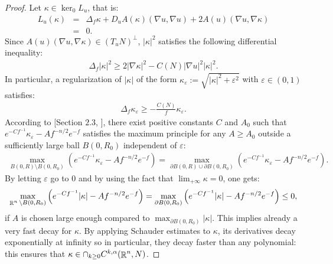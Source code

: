 \documentclass[a4paper,11pt,reqno]{amsart}
\def\R{\mathop{\rm \mathbb{R}}\nolimits}
\begin{document}
\begin{proof}
Let $\kappa\in\ker_0L_u$, that is:
\begin{eqnarray*}
L_u(\kappa)&=&\Delta_f\kappa+D_uA(\kappa)(\nabla u,\nabla u)+2A(u)(\nabla u,\nabla \kappa)\\
&=&0.
\end{eqnarray*}
Since $A(u)(\nabla u,\nabla \kappa)\in (T_uN)^{\perp}$, $|\kappa|^2$ satisfies the following differential inequality:
\begin{eqnarray*}
\Delta_f|\kappa|^2\geq2|\nabla\kappa|^2-C(N)|\nabla u|^2|\kappa|^2.
\end{eqnarray*}
In particular, a regularization of $|\kappa|$ of the form $\kappa_{\varepsilon}:=\sqrt{|\kappa|^2+\varepsilon^2}$ with $\varepsilon\in(0,1)$ satisfies:
\begin{eqnarray*}
\Delta_f\kappa_{\varepsilon}\geq-\frac{C(N)}{f}\kappa_{\varepsilon}.
\end{eqnarray*}
According to [Section $2.3$, \cite{Der-Asy-Com-Egs}], there exist positive constants $C$ and $A_0$ such that $e^{-Cf^{-1}}\kappa_{\varepsilon}-Af^{-n/2}e^{-f}$ satisfies the maximum principle for any $A\geq A_0$  outside a sufficiently large ball $B(0,R_0)$ independent of $\varepsilon$:
\begin{eqnarray*}
\max_{B(0,R)\setminus B(0,R_0)}\left(e^{-Cf^{-1}}\kappa_{\varepsilon}-Af^{-n/2}e^{-f}\right)=\max_{\partial B(0,R)\cup \partial B(0,R_0)}\left(e^{-Cf^{-1}}\kappa_{\varepsilon}-Af^{-n/2}e^{-f}\right).
\end{eqnarray*}
By letting $\varepsilon$ go to $0$ and by using the fact that $\lim_{+\infty}\kappa=0$, one gets:
\begin{eqnarray*}
\max_{\R^n\setminus B(0,R_0)}\left(e^{-Cf^{-1}}|\kappa|-Af^{-n/2}e^{-f}\right)=\max_{\partial B(0,R_0)}\left(e^{-Cf^{-1}}|\kappa|-Af^{-n/2}e^{-f}\right)\leq 0,
\end{eqnarray*}
if $A$ is chosen large enough compared to $\max_{\partial B(0,R_0)}|\kappa|$. This implies already a very fast decay for $\kappa$. By applying Schauder estimates to $\kappa$, its derivatives decay exponentially at infinity so in particular, they decay faster than any polynomial: this ensures that $\kappa \in \cap_{k\geq 0}C^{k,\alpha}(\R^n,N)$.


\end{proof}
\end{document}
